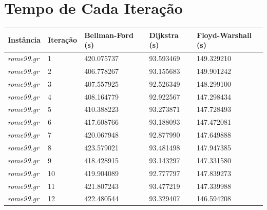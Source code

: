 \documentclass[12pt]{article}
\begin{document}





\section{Tempo de Cada Iteração}
\begin{longtable}{l|l|lll}
    \hline
    \textbf{Instância} & \textbf{Iteração} & \textbf{Bellman-Ford (s)} & \textbf{Dijkstra (s)} & \textbf{Floyd-Warshall (s)} \\ \hline
\textit{rome99.gr}               &  1        & 420.075737             & 93.593469            & 149.329210                   \\
\textit{rome99.gr}               &  2        & 406.778267             & 93.155683            & 149.901242                   \\
\textit{rome99.gr}               &  3        & 407.557925             & 92.526349            & 148.299100                   \\
\textit{rome99.gr}               &  4        & 408.164779             & 92.922567            & 147.298434                   \\
\textit{rome99.gr}               &  5        & 410.388223             & 93.273871            & 147.728493                   \\
\textit{rome99.gr}               &  6        & 417.608766             & 93.188093            & 147.472081                   \\
\textit{rome99.gr}               &  7        & 420.067948             & 92.877990            & 147.649888                   \\
\textit{rome99.gr}               &  8        & 423.579021             & 93.481498            & 147.947385                   \\
\textit{rome99.gr}               &  9        & 418.428915             & 93.143297            & 147.331580                   \\
\textit{rome99.gr}               &  10       & 419.904089             & 92.777797            & 147.839273                   \\
\textit{rome99.gr}               &  11       & 421.807243             & 93.477219            & 147.339988                   \\
\textit{rome99.gr}               &  12       & 422.480544             & 93.329407            & 146.594208                   \\

\end{longtable}
\end{document}
